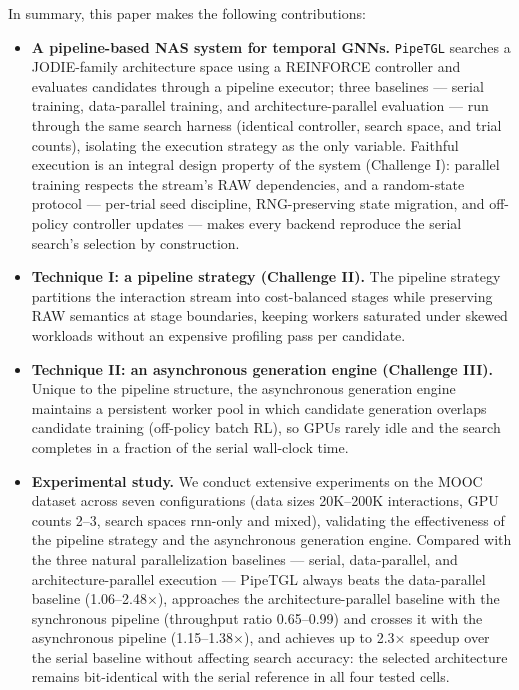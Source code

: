 \documentclass[sigconf, nonacm]{acmart}
\begin{document}
In summary, this paper makes the following contributions:
\begin{itemize}
\item \textbf{A pipeline-based NAS system for temporal GNNs.}
\texttt{PipeTGL} searches a JODIE-family architecture space using a
REINFORCE controller and evaluates candidates through a pipeline
executor; three baselines --- serial training, data-parallel training,
and architecture-parallel evaluation --- run through the same search
harness (identical controller, search space, and trial counts),
isolating the execution strategy as the only variable. Faithful
execution is an integral design property of the system (Challenge I):
parallel training respects the stream's RAW dependencies, and a
random-state protocol --- per-trial seed discipline, RNG-preserving
state migration, and off-policy controller updates --- makes every
backend reproduce the serial search's selection by construction.
\item \textbf{Technique I: a pipeline strategy (Challenge II).} The
pipeline strategy partitions the interaction stream into
cost-balanced stages while preserving RAW semantics at stage
boundaries, keeping workers saturated under skewed workloads without
an expensive profiling pass per candidate.
\item \textbf{Technique II: an asynchronous generation engine
(Challenge III).} Unique to the pipeline structure, the asynchronous
generation engine maintains a persistent worker pool in which
candidate generation overlaps candidate training (off-policy batch
RL), so GPUs rarely idle and the search completes in a fraction of the
serial wall-clock time.
\item \textbf{Experimental study.} We conduct extensive experiments on
the MOOC dataset across seven configurations (data sizes 20K--200K
interactions, GPU counts 2--3, search spaces rnn-only and mixed),
validating the effectiveness of the pipeline strategy and the
asynchronous generation engine. Compared with the three natural
parallelization baselines --- serial, data-parallel, and
architecture-parallel execution --- PipeTGL always beats the
data-parallel baseline (1.06--2.48$\times$), approaches the
architecture-parallel baseline with the synchronous pipeline
(throughput ratio 0.65--0.99) and crosses it with the asynchronous
pipeline (1.15--1.38$\times$), and achieves up to 2.3$\times$ speedup
over the serial baseline without affecting search accuracy: the
selected architecture remains bit-identical with the serial reference
in all four tested cells.
\end{itemize}
\end{document}
